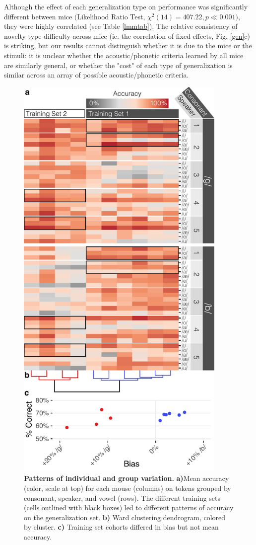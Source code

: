 Although the effect of each generalization type on performance was significantly different between mice $($Likelihood Ratio Test, $\chi^2(14) = 407.22, p \ll 0.001)$, they were highly correlated (see Table \ref{lmmtab}). The relative consistency of novelty type difficulty across mice (ie. the correlation of fixed effects, Fig. \ref{gen}c) is striking, but our results cannot distinguish whether it is due to the mice or the stimuli: it is unclear whether the acoustic/phonetic criteria learned by all mice are similarly general, or whether the "cost" of each type of generalization is similar across an array of possible acoustic/phonetic criteria.


\begin{figure}[!ht]
\includegraphics[width=4in]{speech/figures/Figure4.pdf}
\caption{\textbf{Patterns of individual and group variation.} \textbf{a)}Mean accuracy (color, scale at top) for each mouse (columns) on tokens grouped by consonant, speaker, and vowel (rows). The different training sets (cells outlined with black boxes) led to different patterns of accuracy on the generalization set. \textbf{b)} Ward clustering dendrogram, colored by cluster. \textbf{c)} Training set cohorts differed in bias but not mean accuracy.
\vspace{48pt}
}
\label{heat}
\end{figure}

